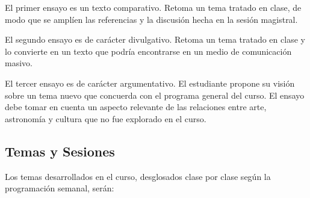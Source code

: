 \documentclass[12pt]{report}
\begin{document}
El primer ensayo es un texto comparativo. Retoma un tema 
tratado en clase, de modo que se ampl\'ien las referencias y la
discusi\'on hecha en la sesi\'on magistral.

El segundo ensayo es de car\'acter divulgativo. Retoma un tema
tratado en clase y lo convierte en un texto que podr\'ia encontrarse
en un medio de comunicaci\'on masivo.  

El tercer ensayo es de car\'acter argumentativo. El estudiante propone
su visi\'on sobre un tema nuevo que concuerda con el programa general
del curso. El ensayo debe tomar en cuenta un aspecto relevante de las
relaciones entre arte, astronom\'ia y cultura que no fue explorado en
el curso.  

\subsection*{Temas y Sesiones}

Los temas desarrollados en el curso, desglosados clase por clase seg\'un
la programaci\'on semanal, ser\'an:
\end{document}
